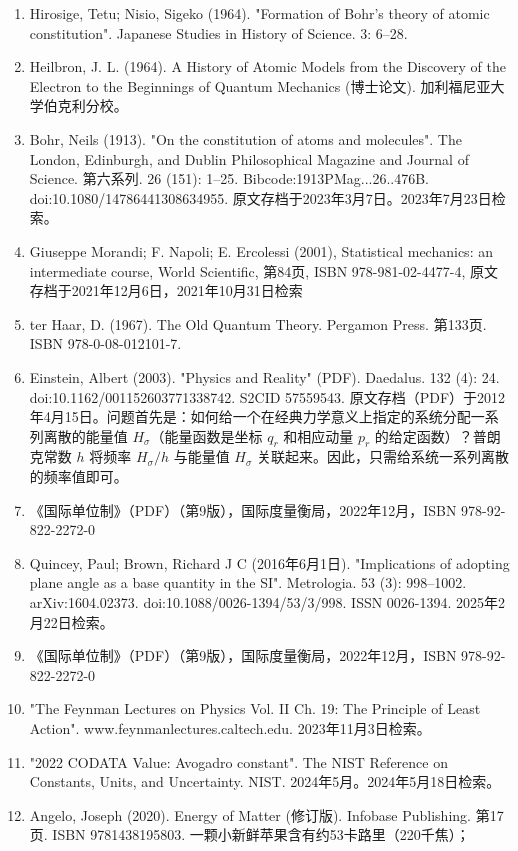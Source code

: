 \begin{enumerate}
\item Hirosige, Tetu; Nisio, Sigeko (1964). "Formation of Bohr's theory of atomic constitution". Japanese Studies in History of Science. 3: 6–28.
\item Heilbron, J. L. (1964). A History of Atomic Models from the Discovery of the Electron to the Beginnings of Quantum Mechanics (博士论文). 加利福尼亚大学伯克利分校。  
\item Bohr, Neils (1913). "On the constitution of atoms and molecules". The London, Edinburgh, and Dublin Philosophical Magazine and Journal of Science. 第六系列. 26 (151): 1–25. Bibcode:1913PMag...26..476B. doi:10.1080/14786441308634955. 原文存档于2023年3月7日。2023年7月23日检索。  
\item Giuseppe Morandi; F. Napoli; E. Ercolessi (2001), Statistical mechanics: an intermediate course, World Scientific, 第84页, ISBN 978-981-02-4477-4, 原文存档于2021年12月6日，2021年10月31日检索  
\item ter Haar, D. (1967). The Old Quantum Theory. Pergamon Press. 第133页. ISBN 978-0-08-012101-7.  
\item Einstein, Albert (2003). "Physics and Reality" (PDF). Daedalus. 132 (4): 24. doi:10.1162/001152603771338742. S2CID 57559543. 原文存档（PDF）于2012年4月15日。问题首先是：如何给一个在经典力学意义上指定的系统分配一系列离散的能量值 \( H_{\sigma} \)（能量函数是坐标 \( q_r \) 和相应动量 \( p_r \) 的给定函数）？普朗克常数 \( h \) 将频率 \( H_{\sigma}/h \) 与能量值 \( H_{\sigma} \) 关联起来。因此，只需给系统一系列离散的频率值即可。
\item 《国际单位制》（PDF）（第9版），国际度量衡局，2022年12月，ISBN 978-92-822-2272-0  
\item Quincey, Paul; Brown, Richard J C (2016年6月1日). "Implications of adopting plane angle as a base quantity in the SI". Metrologia. 53 (3): 998–1002. arXiv:1604.02373. doi:10.1088/0026-1394/53/3/998. ISSN 0026-1394. 2025年2月22日检索。  
\item 《国际单位制》（PDF）（第9版），国际度量衡局，2022年12月，ISBN 978-92-822-2272-0  
\item "The Feynman Lectures on Physics Vol. II Ch. 19: The Principle of Least Action". www.feynmanlectures.caltech.edu. 2023年11月3日检索。  
\item "2022 CODATA Value: Avogadro constant". The NIST Reference on Constants, Units, and Uncertainty. NIST. 2024年5月。2024年5月18日检索。  
\item Angelo, Joseph (2020). Energy of Matter (修订版). Infobase Publishing. 第17页. ISBN 9781438195803. 一颗小新鲜苹果含有约53卡路里（220千焦）；  

\end{enumerate}
